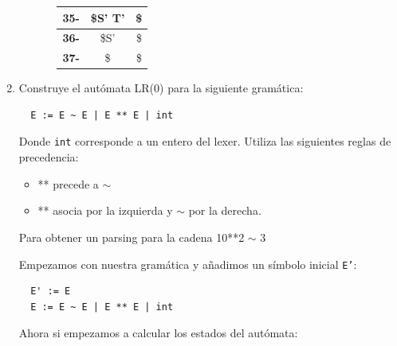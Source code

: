 \documentclass[12pt, letterpaper]{article}
\begin{document}
\begin{enumerate}
\begin{enumerate}[label=(\alph*)]
\begin{enumerate}[label=(\alph*)]
\begin{table}[H]
\begin{tabular}{|c|c|c|}
        \textbf{35-} & \$S' T'                       & \$                                          \\ \hline
        \textbf{36-} & \$S'                          & \$                                          \\ \hline
        \textbf{37-} & \$                            & \$                                          \\ \hline
      \end{tabular}
    \end{table}
  \end{enumerate}
\end{enumerate}
\item Construye el autómata LR(0) para la siguiente gramática:
\begin{verbatim}
  E := E ~ E | E ** E | int
\end{verbatim}
Donde \texttt{int} corresponde a un entero del lexer. Utiliza las siguientes reglas de precedencia:
\begin{itemize}
\item ** precede a $\sim$
\item ** asocia por la izquierda y $\sim$ por la derecha.
\end{itemize}
Para obtener un parsing para la cadena 10**2 $\sim$ 3

Empezamos con nuestra gramática y añadimos un símbolo inicial \texttt{E'}:
\begin{verbatim}
  E' := E
  E := E ~ E | E ** E | int
\end{verbatim}
Ahora si empezamos a calcular los estados del autómata:


\end{enumerate}
\end{document}

